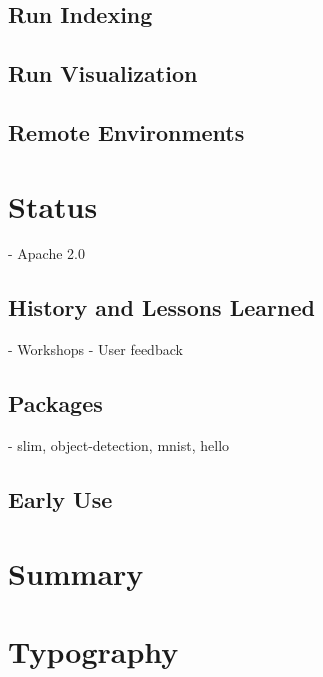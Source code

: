 \documentclass{article}
\begin{document}
\subsection{Run Indexing}

\subsection{Run Visualization}

\subsection{Remote Environments}

\section{Status}

- Apache 2.0

\subsection{History and Lessons Learned}

- Workshops
- User feedback

\subsection{Packages}

- slim, object-detection, mnist, hello

\subsection{Early Use}

\section{Summary}



\section{Typography}

\end{document}

